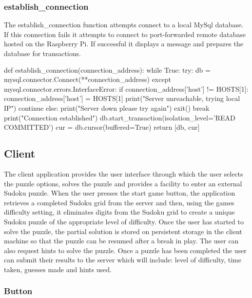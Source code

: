 \documentclass[fleqn]{article}
\begin{document}
\subsubsection{establish\_connection}

The establish\_connection function attempts connect to a local MySql database. If this connection fails it attempts to connect to port-forwarded remote database hosted on the Raspberry Pi. If successful it displays a message and prepares the database for transactions.

\begin{python}
def establish_connection(connection_address):
    while True:
        try:
            db = mysql.connector.Connect(**connection_address)
        except mysql.connector.errors.InterfaceError:
            if connection_address['host'] != HOSTS[1]:
                connection_address['host'] = HOSTS[1]
                print("Server unreachable, trying local IP")
                continue
            else:
                print("Server down please try again")
                exit()
        break
    print("Connection established")
    db.start_transaction(isolation_level='READ COMMITTED')
    cur = db.cursor(buffered=True)
    return [db, cur]
\end{python}    

\subsection{Client}
The client application provides the user interface through which the user selects the puzzle options, solves the puzzle and provides a facility to enter an external Sudoku puzzle.
When the user presses the start game button, the application retrieves a completed Sudoku grid from the server and then, using the games difficulty setting, it eliminates digits from the Sudoku grid to create a unique Sudoku puzzle of the appropriate level of difficulty.
Once the user has started to solve the puzzle, the partial solution is stored on persistent storage in the client machine so that the puzzle can be resumed after a break in play. The user can also request hints to solve the puzzle. Once a
puzzle has been completed the user can submit their results to the server which will include: level of difficulty, time taken, guesses made and hints used.
    
\subsubsection{Button}
\end{document}
